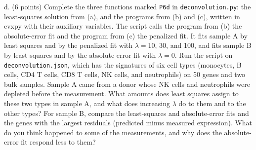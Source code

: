 \documentclass[11pt]{article}
\begin{document}
d. (6 points) Complete the three functions marked {\tt P6d} in {\tt deconvolution.py}: the
least-squares solution from (a), and the programs from (b) and (c), written in cvxpy with their
auxiliary variables. The script calls the program from (b) the absolute-error fit and the
program from (c) the penalized fit. It fits sample A by least squares and by the penalized fit
with $\lambda=10$, 30, and 100, and fits sample B by least squares and by the absolute-error fit
with $\lambda=0$. Run the script on {\tt deconvolution.json}, which has the signatures of six
cell types (monocytes, B cells, CD4 T cells, CD8 T cells, NK cells, and neutrophils) on 50 genes
and two bulk samples. Sample A came from a donor whose NK cells and neutrophils were depleted
before the measurement. What amounts does least squares assign to these two types in sample A,
and what does increasing $\lambda$ do to them and to the other types? For sample B, compare the
least-squares and absolute-error fits and the genes with the largest residuals (predicted
minus measured expression). What do you
think happened to some of the measurements, and why does the absolute-error fit respond less to
them?
\end{document}
